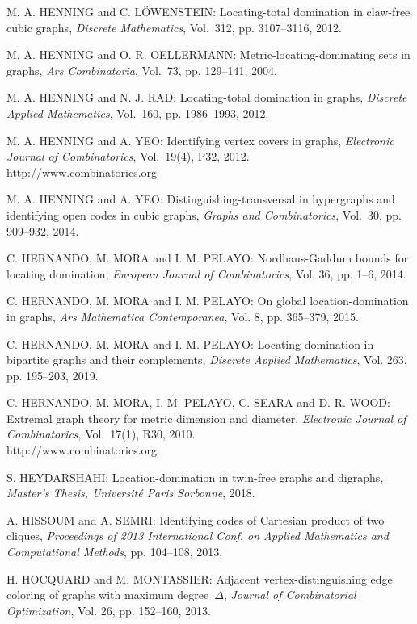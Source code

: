 \begin{thebibliography}{999}
M. A. HENNING and C. L\"{O}WENSTEIN: Locating-total domination in claw-free cubic graphs, {\it Discrete Mathematics}, Vol.~312, pp. 3107--3116, 2012.

M. A. HENNING and O. R. OELLERMANN: Metric-locating-dominating sets in graphs, {\it Ars Combinatoria}, Vol.~73, pp. 129--141, 2004.

M. A. HENNING and N. J. RAD: Locating-total domination in graphs, {\it Discrete Applied Mathematics}, Vol.~160, pp. 1986--1993, 2012.

M. A. HENNING and A. YEO: Identifying vertex covers in graphs, {\it Electronic Journal of Combinatorics}, Vol.~19(4), P32, 2012.\\
http://www.combinatorics.org

M. A. HENNING and A. YEO: Distinguishing-transversal in hypergraphs and identifying open codes in cubic graphs, {\it Graphs and Combinatorics}, Vol.~30, pp. 909--932, 2014.

C. HERNANDO, M. MORA and I. M. PELAYO: Nordhaus-Gaddum bounds for locating domination, {\it European Journal of Combinatorics}, Vol. 36, pp. 1--6, 2014.

C. HERNANDO, M. MORA and I. M. PELAYO: On global location-domination in graphs, {\it Ars Mathematica Contemporanea}, Vol. 8, pp. 365--379, 2015.

C. HERNANDO, M. MORA and I. M. PELAYO: Locating domination in bipartite graphs and their complements, {\it Discrete Applied Mathematics}, Vol. 263, pp. 195--203, 2019.

C. HERNANDO, M. MORA, I. M. PELAYO, C. SEARA and D. R. WOOD: Extremal graph theory for metric dimension and diameter, {\it Electronic Journal of Combinatorics}, Vol.~17(1), R30, 2010.\\
http://www.combinatorics.org

S. HEYDARSHAHI: Location-domination in twin-free graphs and digraphs, {\it Master's Thesis, Universit\'e Paris Sorbonne}, 2018.

A. HISSOUM and A. SEMRI: Identifying codes of Cartesian product of two cliques, {\it Proceedings of 2013 International Conf. on Applied Mathematics and Computational Methods}, pp. 104--108, 2013.

H. HOCQUARD and M. MONTASSIER: Adjacent vertex-distinguishing edge coloring of graphs with maximum degree~$\Delta$, {\it Journal of Combinatorial Optimization}, Vol. 26, pp. 152--160, 2013.


\end{thebibliography}
